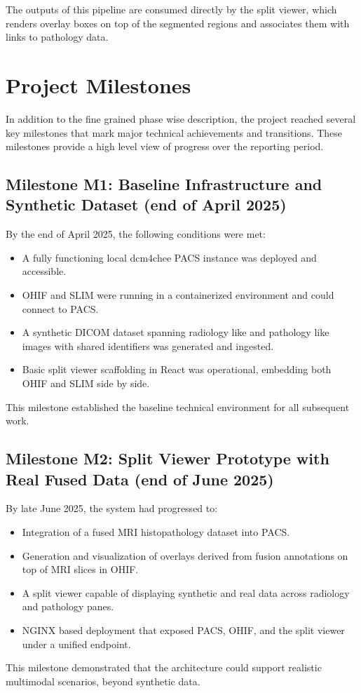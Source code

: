\documentclass[11pt,a4paper]{article}
\begin{document}
The outputs of this pipeline are consumed directly by the split viewer, which renders overlay boxes on top of the segmented regions and associates them with links to pathology data.

\section{Project Milestones}
\label{sec:milestones}

In addition to the fine grained phase wise description, the project reached several key milestones that mark major technical achievements and transitions. These milestones provide a high level view of progress over the reporting period.

\subsection{Milestone M1: Baseline Infrastructure and Synthetic Dataset (end of April 2025)}

By the end of April 2025, the following conditions were met:
\begin{itemize}
    \item A fully functioning local dcm4chee PACS instance was deployed and accessible.
    \item OHIF and SLIM were running in a containerized environment and could connect to PACS.
    \item A synthetic DICOM dataset spanning radiology like and pathology like images with shared identifiers was generated and ingested.
    \item Basic split viewer scaffolding in React was operational, embedding both OHIF and SLIM side by side.
\end{itemize}
This milestone established the baseline technical environment for all subsequent work.

\subsection{Milestone M2: Split Viewer Prototype with Real Fused Data (end of June 2025)}

By late June 2025, the system had progressed to:
\begin{itemize}
    \item Integration of a fused MRI histopathology dataset into PACS.
    \item Generation and visualization of overlays derived from fusion annotations on top of MRI slices in OHIF.
    \item A split viewer capable of displaying synthetic and real data across radiology and pathology panes.
    \item NGINX based deployment that exposed PACS, OHIF, and the split viewer under a unified endpoint.
\end{itemize}
This milestone demonstrated that the architecture could support realistic multimodal scenarios, beyond synthetic data.
\end{document}
